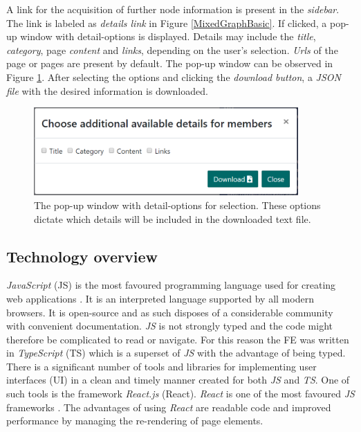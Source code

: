 A link for the acquisition of further node information is present in the \textit{sidebar}. The link is labeled as \textit{details link} in Figure \ref{MixedGraphBasic}. If clicked, a pop-up window with detail-options is displayed. Details may include the \textit{title}, \textit{category}, page \textit{content} and \textit{links}, depending on the user's selection. \textit{Urls} of the page or pages are present by default. The pop-up window can be observed in Figure \ref{detailsOptionsPopup}. After selecting the options and clicking the \textit{download button}, a \textit{JSON file} with the desired information is downloaded.
\begin{figure}[ht!]
  \centering
  \includegraphics[width=0.9\textwidth]{Images/options_popup.png}
  \caption{The pop-up window with detail-options for selection. These options dictate which details will be included in the downloaded text file.}
  \label{detailsOptionsPopup}
\end{figure} 

\subsection{Technology overview}
\textit{JavaScript} \cite{javaScript} (JS) is the most favoured programming language used for creating web applications \cite{jsGithut}. It is an interpreted language supported by all modern browsers. It is open-source and as such disposes of a considerable community with convenient documentation. \textit{JS} is not strongly typed and the code might therefore be complicated to read or navigate. For this reason the FE was written in \textit{TypeScript} (TS) \cite{typeScript} which is a superset of \textit{JS} with the advantage of being typed. There is a significant number of tools and libraries for implementing user interfaces (UI) in a clean and timely manner created for both \textit{JS} and \textit{TS}. One of such tools is the framework \textit{React.js} \cite{react} (React). \textit{React} is one of the most favoured \textit{JS} frameworks \cite{reactPopularity}. The advantages of using \textit{React} are readable code and improved performance by managing the re-rendering of page elements.

